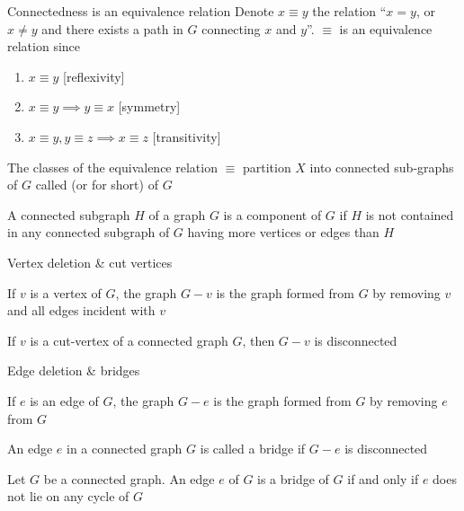 \documentclass[aspectratio=43]{beamer}
\begin{document}
\begin{frame}{Connectedness is an equivalence relation}
	Denote $x\equiv y$ the relation  ``$x=y$, or $x\neq y$ and there exists a path in $G$ connecting $x$ and $y$''. $\equiv$ is an equivalence relation since
	\begin{enumerate}
		\item $x\equiv y$ \hfill[reflexivity]
		\item $x\equiv y\implies y\equiv x$ \hfill[symmetry]
		\item $x\equiv y, y\equiv z\implies x\equiv z$ \hfill[transitivity]
	\end{enumerate}
	\vfill
	\begin{definition}
		The classes of the equivalence relation $\equiv$ partition $X$ into connected sub-graphs of $G$ called  (or  for short) of $G$
	\end{definition}
	\vfill
	A connected subgraph $H$ of a graph $G$ is a component of $G$ if $H$ is not contained in any connected subgraph of $G$ having more vertices or edges than $H$
\end{frame}



\begin{frame}{Vertex deletion \& cut vertices}
\begin{definition}
If $v$ is a vertex of $G$, the graph $G-v$ is the graph formed from $G$ by removing $v$ and all edges incident with $v$
\end{definition}
\vfill
\begin{definition}
	If $v$ is a cut-vertex of a connected graph $G$, then $G-v$ is disconnected
\end{definition}
\end{frame}


\begin{frame}{Edge deletion \& bridges}
\begin{definition}
	If $e$ is an edge of $G$, the graph $G-e$ is the graph formed from $G$ by removing $e$ from $G$
\end{definition}
\vfill
\begin{definition}[{Bridge}]
An edge $e$ in a connected graph $G$ is called a bridge if $G-e$ is disconnected
\end{definition}
\vfill
\begin{theorem}
Let $G$ be a connected graph. An edge $e$ of $G$ is a bridge of $G$ if and only if $e$ does not lie on any cycle of $G$
\end{theorem}
\end{frame}
\end{document}
